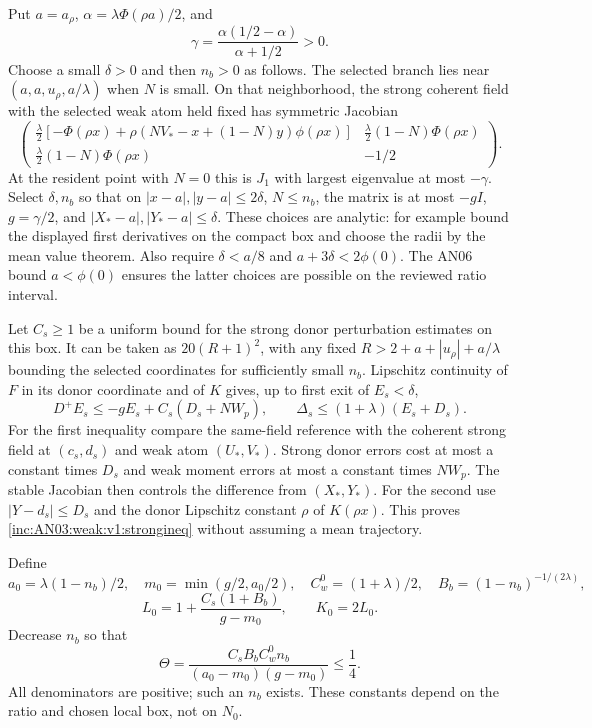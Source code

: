 \documentclass[11pt]{article}
\numberwithin{equation}{section}
\theoremstyle{remark}\newtheorem{remark}[theorem]{Remark}
\begin{document}
Put $a=a_\rho$, $\alpha=\lambda\Phi(\rho a)/2$, and
\[
 \gamma=\frac{\alpha(1/2-\alpha)}{\alpha+1/2}>0.
\]
Choose a small $\delta>0$ and then $n_b>0$ as follows. The selected branch lies near $(a,a,u_\rho,a/\lambda)$ when $N$ is small. On that neighborhood, the strong coherent field with the selected weak atom held fixed has symmetric Jacobian
\[
 \begin{pmatrix}
 \frac\lambda2[-\Phi(\rho x)+\rho(NV_*-x+(1-N)y)\phi(\rho x)]
 &\frac\lambda2(1-N)\Phi(\rho x)\\
 \frac\lambda2(1-N)\Phi(\rho x)&-1/2
 \end{pmatrix}.
\]
At the resident point with $N=0$ this is $J_1$ with largest eigenvalue at most $-\gamma$. Select $\delta,n_b$ so that on $|x-a|,|y-a|\le2\delta$, $N\le n_b$, the matrix is at most $-gI$, $g=\gamma/2$, and $|X_*-a|,|Y_*-a|\le\delta$. These choices are analytic: for example bound the displayed first derivatives on the compact box and choose the radii by the mean value theorem. Also require $\delta<a/8$ and $a+3\delta<2\phi(0)$. The AN06 bound $a<\phi(0)$ ensures the latter choices are possible on the reviewed ratio interval.

Let $C_s\ge1$ be a uniform bound for the strong donor perturbation estimates on this box. It can be taken as $20(R+1)^2$, with any fixed $R>2+a+|u_\rho|+a/\lambda$ bounding the selected coordinates for sufficiently small $n_b$. Lipschitz continuity of $F$ in its donor coordinate and of $K$ gives, up to first exit of $E_s<\delta$,
\begin{equation}\label{inc:AN03:weak:v1:strongineq}
 D^+E_s\le-gE_s+C_s(D_s+NW_p),\qquad
 \Delta_s\le(1+\lambda)(E_s+D_s).
\end{equation}
For the first inequality compare the same-field reference with the coherent strong field at $(c_s,d_s)$ and weak atom $(U_*,V_*)$. Strong donor errors cost at most a constant times $D_s$ and weak moment errors at most a constant times $NW_p$. The stable Jacobian then controls the difference from $(X_*,Y_*)$. For the second use $|Y-d_s|\le D_s$ and the donor Lipschitz constant $\rho$ of $K(\rho x)$. This proves \eqref{inc:AN03:weak:v1:strongineq} without assuming a mean trajectory.

Define
\[
 a_0=\lambda(1-n_b)/2,\quad m_0=\min(g/2,a_0/2),\quad C_w^0=(1+\lambda)/2,\quad B_b=(1-n_b)^{-1/(2\lambda)},
\]
\[
 L_0=1+\frac{C_s(1+B_b)}{g-m_0},\qquad K_0=2L_0.
\]
Decrease $n_b$ so that
\begin{equation}\label{inc:AN03:weak:v1:smallgain}
 \Theta=\frac{C_sB_bC_w^0n_b}{(a_0-m_0)(g-m_0)}\le\frac14.
\end{equation}
All denominators are positive; such an $n_b$ exists. These constants depend on the ratio and chosen local box, not on $N_0$.
\end{document}
